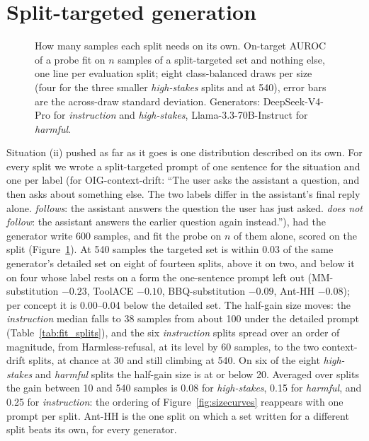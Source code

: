 \documentclass{article} %
\newcommand{\hs}{\emph{high-stakes}}
\newcommand{\harm}{\emph{harmful}}
\newcommand{\instr}{\emph{instruction}}
\begin{document}
\section{Split-targeted generation}
\label{app:targeted}
\label{sec:llmprompts}
\begin{figure}[H]
  \centering
  
  \caption{How many samples each split needs on its own. On-target AUROC of a probe fit on $n$ samples of a split-targeted set and nothing else, one line per evaluation split; eight class-balanced draws per size (four for the three smaller \hs{} splits and at 540), error bars are the across-draw standard deviation. Generators: DeepSeek-V4-Pro for \instr{} and \hs{}, Llama-3.3-70B-Instruct for \harm{}.}
  \label{fig:targeted}
\end{figure}

Situation (ii) pushed as far as it goes is one distribution described on its own. For every split we wrote a split-targeted prompt of one sentence for the situation and one per label (for OIG-context-drift: ``The user asks the assistant a question, and then asks about something else. The two labels differ in the assistant's final reply alone. \emph{follows}: the assistant answers the question the user has just asked. \emph{does not follow}: the assistant answers the earlier question again instead.''), had the generator write 600 samples, and fit the probe on $n$ of them alone, scored on the split (Figure~\ref{fig:targeted}). At 540 samples the targeted set is within 0.03 of the same generator's detailed set on eight of fourteen splits, above it on two, and below it on four whose label rests on a form the one-sentence prompt left out (MM-substitution $-0.23$, ToolACE $-0.10$, BBQ-substitution $-0.09$, Ant-HH $-0.08$); per concept it is 0.00--0.04 below the detailed set. The half-gain size moves: the \instr{} median falls to 38 samples from about 100 under the detailed prompt (Table~\ref{tab:fit_splits}), and the six \instr{} splits spread over an order of magnitude, from Harmless-refusal, at its level by 60 samples, to the two context-drift splits, at chance at 30 and still climbing at 540. On six of the eight \hs{} and \harm{} splits the half-gain size is at or below 20. Averaged over splits the gain between 10 and 540 samples is 0.08 for \hs{}, 0.15 for \harm{}, and 0.25 for \instr{}: the ordering of Figure~\ref{fig:sizecurves} reappears with one prompt per split. Ant-HH is the one split on which a set written for a different split beats its own, for every generator.
\end{document}
